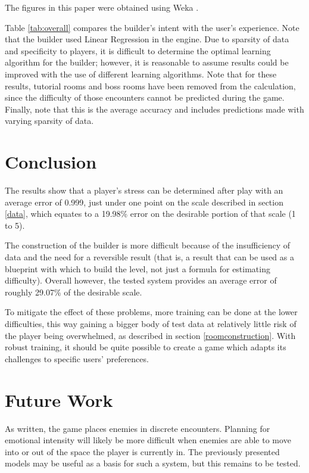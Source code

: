 \documentclass[a4paper]{article}
\begin{document}
\begin{multicols*}{2}
The figures in this paper were obtained using Weka \cite{weka}.

Table \ref{tab:overall} compares the builder's intent with the user's experience. Note that the builder used Linear Regression in the engine.
Due to sparsity of data and specificity to players, it is difficult to determine the optimal learning algorithm for the builder; however, it is reasonable to assume results could be improved with the use of different learning algorithms. 
Note that for these results, tutorial rooms and boss rooms have been removed from the calculation, since the difficulty of those encounters cannot be predicted during the game.
Finally, note that this is the average accuracy and includes predictions made with varying sparsity of data.

\section{Conclusion}
The results show that a player's stress can be determined after play with an average error of 0.999, just under one point on the scale described in section \ref{data}, which equates to a 19.98\% error on the desirable portion of that scale (1 to 5).

The construction of the builder is more difficult because of the insufficiency of data and the need for a reversible result (that is, a result that can be used as a blueprint with which to build the level, not just a formula for estimating difficulty). Overall however, the tested system provides an average error of roughly 29.07\% of the desirable scale.

To mitigate the effect of these problems, more training can be done at the lower difficulties, this way gaining a bigger body of test data at relatively little risk of the player being overwhelmed, as described in section \ref{roomconstruction}. With robust training, it should be quite possible to create a game which adapts its challenges to specific users' preferences.

\section{Future Work}
As written, the game places enemies in discrete encounters. Planning for emotional intensity will likely be more difficult when enemies are able to move into or out of the space the player is currently in. The previously presented models may be useful as a basis for such a system, but this remains to be tested.


\end{multicols*}
\end{document}
